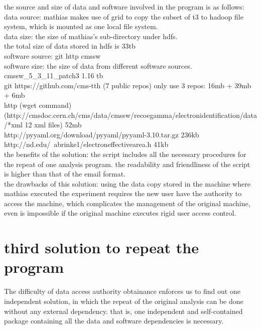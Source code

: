 \documentclass{article}
\begin{document}
the source and size of data and software involved in the program is as follows:\\
\indent data source: mathias makes use of grid to copy the subset of t3 to hadoop file system, which is mounted as one local file system.\\
\indent data size: the size of mathias’s sub-directory under hdfs.\\
\indent \indent the total size of data stored in hdfs is 33tb\\
\indent software source: git http cmssw\\
\indent software size: the size of data from different software sources.\\
\indent \indent cmssw\_5\_3\_11\_patch3          1.16 tb\\
\indent \indent git https://github.com/cms-tth (7 public repos)   only use 3 repos: 16mb + 39mb + 6mb\\
\indent \indent http (wget command)\\
\indent \indent (http://cmsdoc.cern.ch/cms/data/cmssw/recoegamma/electronidentification/data/*xml  12 xml files)  52mb\\
\indent \indent http://pyyaml.org/download/pyyaml/pyyaml-3.10.tar.gz    236kb\\
\indent \indent http://nd.edu/~abrinke1/electroneffectivearea.h      41kb\\

the benefits of the solution: the script includes all the necessary procedures for the repeat of one analysis program. the readability and friendliness of the script is higher than that of the email format.\\

the drawbacks of this solution: using the data copy stored in the machine where mathias executed the experiment requires the new user have the authority to access the machine, which complicates the management of the original machine, even is impossible if the original machine executes rigid user access control.

\section{third solution to repeat the program}
\indent The difficulty of data access authority obtainance enforces us to find out one independent solution, in which the repeat of the original analysis can be done without any external dependency. that is, one independent and self-contained package containing all the data and software dependencies is necessary.\\
\end{document}

